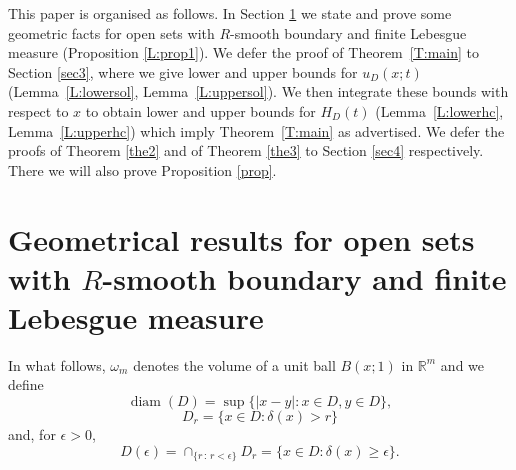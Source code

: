 \documentclass[a4paper,9pt]{amsart}
\begin{document}
This paper is organised as follows. In Section \ref{sec2} we state
and prove some geometric facts for open sets with $R$-smooth
boundary and finite Lebesgue measure (Proposition \ref{L:prop1}).
We defer the proof of Theorem~\ref{T:main} to Section \ref{sec3},
where we give lower and upper bounds for $u_{D}(x;t)$
(Lemma~\ref{L:lowersol}, Lemma~\ref{L:uppersol}). We then
integrate these bounds with respect to $x$ to obtain lower and
upper bounds for $H_{D}(t)$ (Lemma~\ref{L:lowerhc},
Lemma~\ref{L:upperhc}) which imply Theorem~\ref{T:main} as
advertised. We defer the proofs of Theorem \ref{the2} and of
Theorem \ref{the3} to Section \ref{sec4} respectively. There we
will also prove Proposition \ref{prop}.

\section{Geometrical results for open sets with $R$-smooth boundary and finite Lebesgue
measure}\label{sec2} In what follows, $\omega_{m}$ denotes the
volume of a unit ball $B(x;1)$ in ${\mathbb{R}}^{m}$ and we define
\begin{equation*}
\operatorname{diam}(D)=\sup\{|x-y|:x\in D, y\in D\},
\end{equation*}
\begin{equation*}
D_{r}=\{x \in D : \delta(x)>r\}
\end{equation*}
and, for $\epsilon > 0$,
\begin{equation*}
D(\epsilon) = \cap_{\{r \, : \, r<\epsilon\}} D_{r} =\{x\in D :
\delta (x) \geq \epsilon\}.
\end{equation*}
\end{document}
